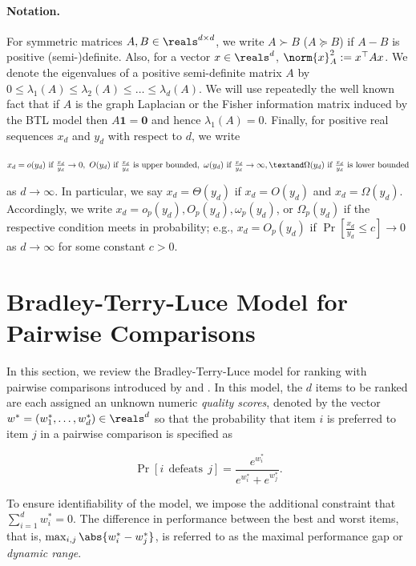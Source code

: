 \paragraph{Notation.}
For symmetric matrices $A, B \in \reals^{d \times d}$, we write $A \succ B$ ($A \succeq B$) if $A - B$ is positive (semi-)definite. Also, for a vector $x \in \reals^d$, $\norm{x}_A^2 := x^\top A x$. We denote the eigenvalues of a positive semi-definite matrix $A$ by $0 \leq \lambda_1(A) \leq \lambda_2(A) \leq \dots \leq \lambda_d(A)$. We will use repeatedly the well known fact that if $A$ is the graph Laplacian or the Fisher information matrix induced by the BTL model then $A \mathbf{1} = \mathbf{0}$ and hence $\lambda_1(A) = 0$. Finally, for positive real sequences $x_d$ and $y_d$ with respect to $d$, we write

$ x_d = 

    o(y_d) ~\text{if}~ \frac{x_d}{y_d} \rightarrow 0,~ O(y_d) ~\text{if}~ \frac{x_d}{y_d} ~\text{is upper bounded},~
    \omega(y_d) ~\text{if}~ \frac{x_d}{y_d} \rightarrow \infty, \textand
    \Omega(y_d) ~\text{if}~ \frac{x_d}{y_d} ~\text{is lower bounded} $

as $d \rightarrow \infty$. In particular, we say $x_d = \Theta(y_d)$ if $x_d = O(y_d)$ and $x_d = \Omega(y_d)$. Accordingly, we write $x_d = o_p(y_d), O_p(y_d), \omega_p(y_d)$, or $\Omega_p(y_d)$ if the respective condition meets in probability; e.g., $x_d = O_p(y_d)$ if $\Pr[\frac{x_d}{y_d} \leq c] \rightarrow 0$ as $d \rightarrow \infty$ for some constant $c > 0$. 

\section{Bradley-Terry-Luce Model for Pairwise Comparisons} \label{sec:setting}

In this section, we review the Bradley-Terry-Luce model for ranking with pairwise comparisons introduced by \citet{bradley1952rank} and \citet{luce2012individual}. In this model, the $d$ items to be ranked   are each assigned an unknown numeric {\it quality scores}, denoted by the vector $w^* = (w^*_1,\ldots,w^*_d) \in \reals^d$ so that the probability that item $i$ is preferred to item $j$ in a pairwise comparison is specified as

\begin{equation}
    \Pr[i ~~\text{defeats}~~ j] = \frac{e^{w^*_i}}{e^{w^*_i}+e^{w^*_j}}.
\end{equation}

To ensure identifiability of the model, we impose the additional constraint that $\sum_{i=1}^d w^*_i = 0$. The difference in performance between the best and worst items, that is, $\max_{i,j} \abs{w_i^* - w_j^*}$, is referred to as the maximal performance gap or {\it dynamic range}.

